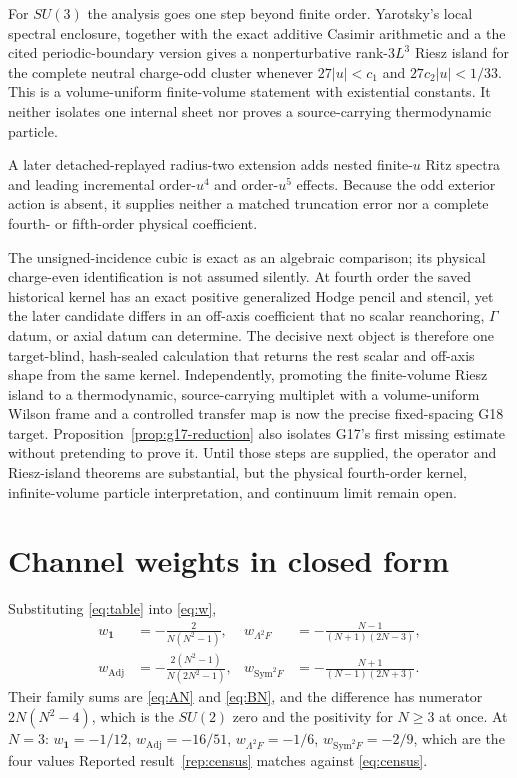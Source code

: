 \documentclass[11pt]{article}
\theoremstyle{plain}
\theoremstyle{definition}
\theoremstyle{remark}
\newcommand{\chk}[1]{}
\begin{document}
For $SU(3)$ the analysis goes one step beyond finite order. Yarotsky's local
spectral enclosure, together with the exact additive Casimir arithmetic and a
the cited periodic-boundary version gives a nonperturbative rank-$3L^3$ Riesz island
for the complete neutral charge-odd cluster whenever
$27|u|<c_1$ and $27c_2|u|<1/33$. This is a volume-uniform finite-volume
statement with existential constants. It neither isolates one internal sheet
nor proves a source-carrying thermodynamic particle.

A later detached-replayed radius-two extension adds nested finite-$u$ Ritz
spectra and leading incremental order-$u^4$ and order-$u^5$ effects. Because
the odd exterior action is absent, it supplies neither a matched truncation
error nor a complete fourth- or fifth-order physical coefficient.

The unsigned-incidence cubic is exact as an algebraic comparison; its physical
charge-even identification is not assumed silently. At fourth order the saved
historical kernel has an exact positive generalized Hodge pencil and stencil,
yet the later candidate differs in an off-axis coefficient that no scalar
reanchoring, $\Gamma$ datum, or axial datum can determine. The decisive next
object is therefore one target-blind, hash-sealed calculation that returns the
rest scalar and off-axis shape from the same kernel. Independently, promoting
the finite-volume Riesz island to a thermodynamic, source-carrying multiplet
with a volume-uniform Wilson frame and a controlled transfer map is now the
precise fixed-spacing G18 target. Proposition~\ref{prop:g17-reduction} also
isolates G17's first missing estimate without pretending to prove it. Until
those steps are supplied, the operator and Riesz-island theorems are
substantial, but the physical fourth-order kernel, infinite-volume particle
interpretation, and continuum limit remain open.

\appendix

\section{Channel weights in closed form}\label{app:closed}

Substituting \eqref{eq:table} into \eqref{eq:w},
\begingroup\small
\begin{align*}
  w_{\mathbf 1}&=-\frac{2}{N(N^2-1)}, &
  w_{\Lambda^2F}&=-\frac{N-1}{(N+1)(2N-3)},\\
  w_{\mathrm{Adj}}&=-\frac{2(N^2-1)}{N(2N^2-1)}, &
  w_{\mathrm{Sym}^2F}&=-\frac{N+1}{(N-1)(2N+3)} .
\end{align*}
\endgroup
Their family sums are \eqref{eq:AN} and \eqref{eq:BN}, and the difference has
numerator $2N(N^2-4)$, which is the $SU(2)$ zero and the positivity for
$N\ge3$ at once.
\chk{the four channel weights follow from dimension and Casimir} At $N=3$:
$w_{\mathbf 1}=-1/12$, $w_{\mathrm{Adj}}=-16/51$, $w_{\Lambda^2F}=-1/6$,
$w_{\mathrm{Sym}^2F}=-2/9$, which are the four values
Reported result~\ref{rep:census} matches against \eqref{eq:census}.
\end{document}
